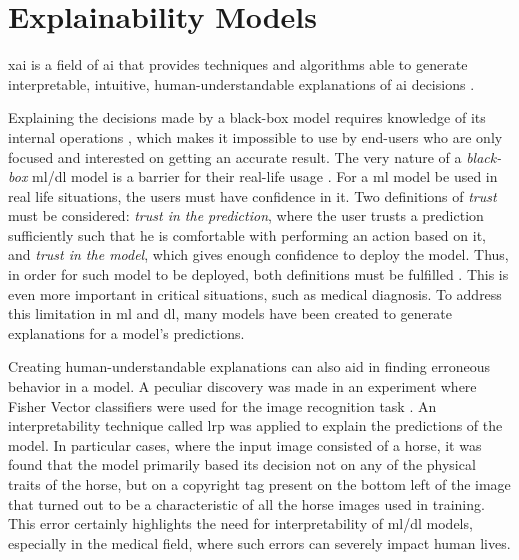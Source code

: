 
\chapter{Explainability Models}
\label{ch:omnisiste}



\gls{xai} is a field of \gls{ai} that provides techniques and algorithms able to generate interpretable, intuitive, human-understandable explanations of \gls{ai} decisions \cite{XAI}.

Explaining the decisions made by a black-box model requires knowledge of its internal operations \cite{XAI}, which makes it impossible to use by end-users who are only focused and interested on getting an accurate result.
The very nature of a \textit{black-box} \gls{ml}/\gls{dl} model is a barrier for their real-life usage \cite{DeepLIFT}. For a \gls{ml} model be used in real life situations, the users must have confidence in it. Two definitions of \textit{trust} must be considered: \textit{trust in the prediction}, where the user trusts a prediction sufficiently such that he is comfortable with performing an action based on it, and \textit{trust in the model}, which gives enough confidence to deploy the model. Thus, in order for such model to be deployed, both definitions must be fulfilled \cite{LIME}. This is even more important in critical situations, such as medical diagnosis. To address this limitation in \gls{ml} and \gls{dl}, many models have been created to generate explanations for a model's predictions. 

Creating human-understandable explanations can also aid in finding erroneous behavior in a model. A peculiar discovery was made in an experiment where Fisher Vector classifiers were used for the image recognition task \cite{FisherVectors}. An interpretability technique called \gls{lrp} was applied to explain the predictions of the model. In particular cases, where the input image consisted of a horse, it was found that the model primarily based its decision not on any of the physical traits of the horse, but on a copyright tag present on the bottom left of the image that turned out to be a characteristic of all the horse images used in training. This error certainly highlights the need for interpretability of \gls{ml}/\gls{dl} models, especially in the medical field, where such errors can severely impact human lives.


